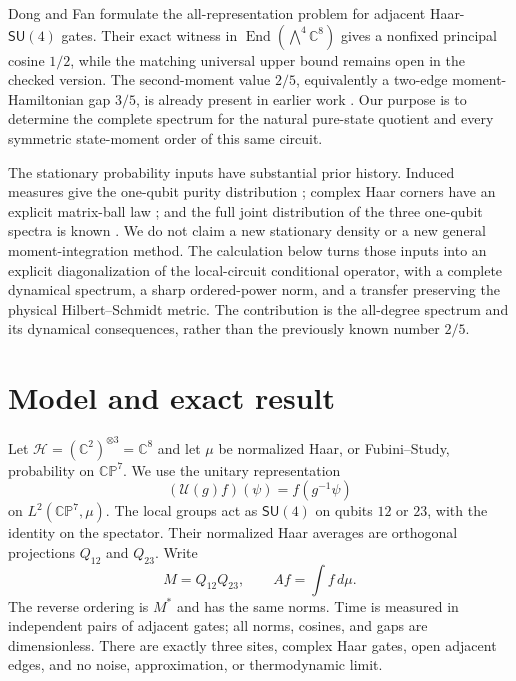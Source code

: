 \documentclass[aps,pra,reprint,amsmath,amssymb,longbibliography]{revtex4-2}
\newcommand{\C}{\mathbb C}
\newcommand{\CP}{\mathbb {CP}}
\newcommand{\End}{\operatorname{End}}
\newcommand{\SU}{\mathsf{SU}}
\begin{document}
Dong and Fan \cite{Dong2026} formulate the all-representation problem for adjacent Haar-$\SU(4)$ gates. Their exact witness in $\End(\bigwedge^4\C^8)$ gives a nonfixed principal cosine $1/2$, while the matching universal upper bound remains open in the checked version. The second-moment value $2/5$, equivalently a two-edge moment-Hamiltonian gap $3/5$, is already present in earlier work \cite{Haferkamp2021}. Our purpose is to determine the complete spectrum for the natural pure-state quotient and every symmetric state-moment order of this same circuit.

The stationary probability inputs have substantial prior history. Induced measures give the one-qubit purity distribution \cite{Zyczkowski2001,Enriquez2018}; complex Haar corners have an explicit matrix-ball law \cite{Fyodorov2007}; and the full joint distribution of the three one-qubit spectra is known \cite{Christandl2014}. We do not claim a new stationary density or a new general moment-integration method. The calculation below turns those inputs into an explicit diagonalization of the local-circuit conditional operator, with a complete dynamical spectrum, a sharp ordered-power norm, and a transfer preserving the physical Hilbert--Schmidt metric. The contribution is the all-degree spectrum and its dynamical consequences, rather than the previously known number $2/5$.

\section{Model and exact result}
\label{sec:model}

Let $\mathcal H=(\C^2)^{\otimes3}=\C^8$ and let $\mu$ be normalized Haar, or Fubini--Study, probability on $\CP^7$. We use the unitary representation
\begin{equation}
 (\mathcal U(g)f)(\psi)=f(g^{-1}\psi)
\end{equation}
on $L^2(\CP^7,\mu)$. The local groups act as $\SU(4)$ on qubits $12$ or $23$, with the identity on the spectator. Their normalized Haar averages are orthogonal projections $Q_{12}$ and $Q_{23}$. Write
\begin{equation}
 M=Q_{12}Q_{23},\qquad Af=\int f\,d\mu.
\label{eq:M}
\end{equation}
The reverse ordering is $M^*$ and has the same norms. Time is measured in independent pairs of adjacent gates; all norms, cosines, and gaps are dimensionless. There are exactly three sites, complex Haar gates, open adjacent edges, and no noise, approximation, or thermodynamic limit.
\end{document}
